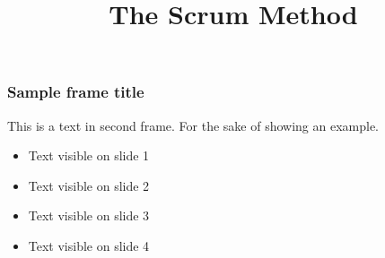 \documentclass{beamer}
\title{The Scrum Method}
\begin{document}
\begin{frame}
    \frametitle{Sample frame title}
    
    This is a text in second frame. 
    For the sake of showing an example.
    
    \begin{itemize}
     \item<1-> Text visible on slide 1
     \item<2-> Text visible on slide 2
     \item<3> Text visible on slide 3
     \item<4-> Text visible on slide 4
    \end{itemize}
    
    \end{frame}
\end{document}
